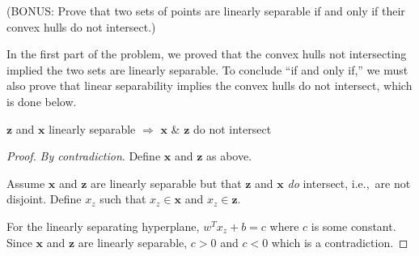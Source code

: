 
\noindent
\begin{subproblem}
  (BONUS\@: Prove that two sets of points are linearly separable if and only if their convex hulls do not intersect.)
\end{subproblem}

In the first part of the problem, we proved that the convex hulls not intersecting implied the two sets are linearly separable.  To conclude ``if and only if,'' we must also prove that linear separability implies the convex hulls do not intersect, which is done below.

\begin{lemma}
  $\mathbf{z}$ and $\mathbf{x}$ linearly separable $\Rightarrow$ $\mathbf{x}$ \& $\mathbf{z}$ do not intersect
\end{lemma}

\begin{proof}
  \textit{By contradiction}.  Define $\mathbf{x}$ and $\mathbf{z}$ as above.

  Assume $\mathbf{x}$ and $\mathbf{z}$ are linearly separable but that $\mathbf{z}$ and $\mathbf{x}$ \textit{do} intersect, i.e.,~are not disjoint. Define $x_{z}$ such that $x_{z}\in\mathbf{x}$ and $x_z\in\mathbf{z}$.

  For the linearly separating hyperplane, $w^{T}x_{z}+b = c$ where $c$ is some constant.  Since $\mathbf{x}$ and $\mathbf{z}$ are linearly separable, $c>0$ and $c<0$ which is a contradiction.
\end{proof}
